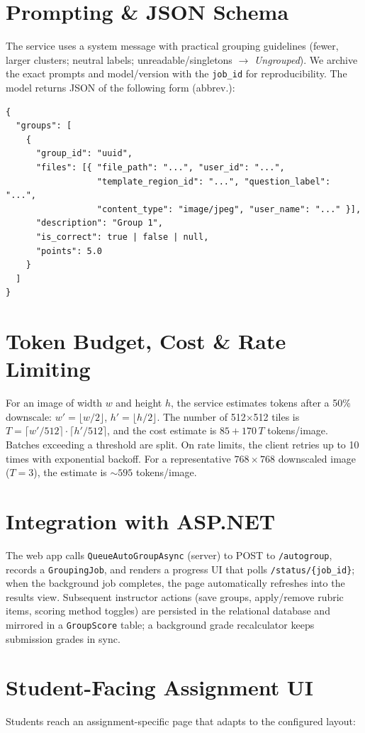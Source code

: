 \documentclass[ms,twoside,print]{nuthesis}
\begin{document}
\section{Prompting \& JSON Schema}
The service uses a system message with practical grouping guidelines (fewer, larger clusters; neutral labels; unreadable/singletons $\rightarrow$ \emph{Ungrouped}). We archive the exact prompts and model/version with the \texttt{job\_id} for reproducibility. The model returns JSON of the following form (abbrev.):
{\small
\begin{verbatim}
{
  "groups": [
    {
      "group_id": "uuid",
      "files": [{ "file_path": "...", "user_id": "...",
                  "template_region_id": "...", "question_label": "...",
                  "content_type": "image/jpeg", "user_name": "..." }],
      "description": "Group 1",
      "is_correct": true | false | null,
      "points": 5.0
    }
  ]
}
\end{verbatim}
}

\section{Token Budget, Cost \& Rate Limiting}
For an image of width $w$ and height $h$, the service estimates tokens after a 50\% downscale: $w' = \lfloor w/2 \rfloor$, $h' = \lfloor h/2 \rfloor$. The number of 512$\times$512 tiles is $T=\lceil w'/512 \rceil\cdot\lceil h'/512 \rceil$, and the cost estimate is $85 + 170\,T$ tokens/image. Batches exceeding a threshold are split. On rate limits, the client retries up to 10 times with exponential backoff. For a representative $768\times 768$ downscaled image ($T=3$), the estimate is $\sim595$ tokens/image.

\section{Integration with ASP.NET}
The web app calls \texttt{QueueAutoGroupAsync} (server) to POST to \texttt{/autogroup}, records a \texttt{GroupingJob}, and renders a progress UI that polls \texttt{/status/\{job\_id\}}; when the background job completes, the page automatically refreshes into the results view. Subsequent instructor actions (save groups, apply/remove rubric items, scoring method toggles) are persisted in the relational database and mirrored in a \texttt{GroupScore} table; a background grade recalculator keeps submission grades in sync.

\section{Student-Facing Assignment UI}
Students reach an assignment-specific page that adapts to the configured layout:
\end{document}
